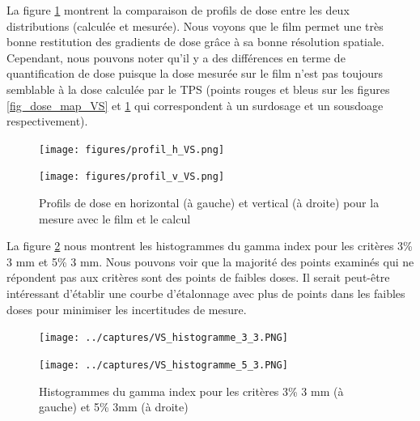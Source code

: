 \documentclass{book}
\begin{document}
La figure \ref*{fig_profil_h_v_VS} montrent la comparaison de profils de dose entre les deux distributions (calculée et mesurée). Nous voyons que le film permet une très bonne restitution des gradients de dose grâce à sa bonne résolution spatiale. Cependant, nous pouvons noter qu'il y a des différences en terme de quantification de dose puisque la dose mesurée sur le film n'est pas toujours semblable à la dose calculée par le TPS (points rouges et bleus sur les figures \ref*{fig_dose_map_VS} et \ref*{fig_profil_h_v_VS} qui correspondent à un surdosage et un sousdoage respectivement).

\begin{figure}[h]
  \centering
  \begin{minipage}{.45\linewidth}
    \texttt{[image: figures/profil\_h\_VS.png]}
  \end{minipage}
  \begin{minipage}{.45\linewidth}
    \texttt{[image: figures/profil\_v\_VS.png]}
  \end{minipage}
  \caption{Profils de dose en horizontal (à gauche) et vertical (à droite) pour la mesure avec le film et le calcul}
  \label{fig_profil_h_v_VS}
\end{figure}

La figure \ref*{fig_histo} nous montrent les histogrammes du gamma index pour les critères 3\% 3 mm et 5\% 3 mm. Nous pouvons voir que la majorité des points examinés qui ne répondent pas aux critères sont des points de faibles doses. Il serait peut-être intéressant d'établir une courbe d'étalonnage avec plus de points dans les faibles doses pour minimiser les incertitudes de mesure.

\begin{figure}[h]
  \centering
  \begin{minipage}{.4\linewidth}
    \texttt{[image: ../captures/VS\_histogramme\_3\_3.PNG]}
  \end{minipage}
  \begin{minipage}{.4\linewidth}
    \texttt{[image: ../captures/VS\_histogramme\_5\_3.PNG]}
  \end{minipage}
  \caption{Histogrammes du gamma index pour les critères 3\% 3 mm (à gauche) et 5\% 3mm (à droite)}
  \label{fig_histo}
\end{figure}

  
\end{document}
